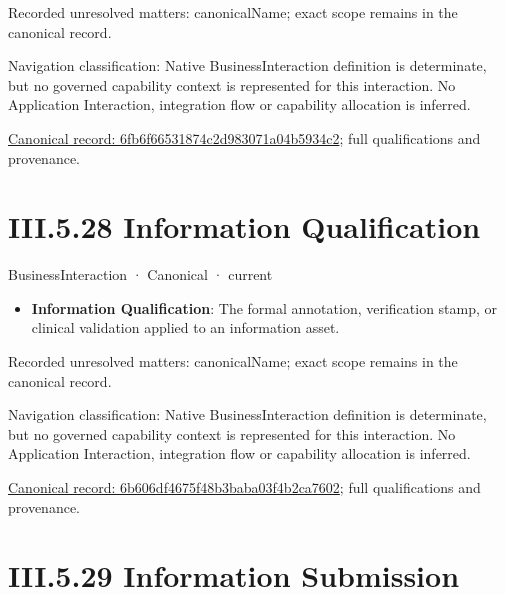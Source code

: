 {\small Recorded unresolved matters: canonicalName; exact scope remains in the canonical record.}\par
{\small Navigation classification: Native BusinessInteraction definition is determinate, but no governed capability context is represented for this interaction. No Application Interaction, integration flow or capability allocation is inferred.}\par
{\footnotesize \href{../../../../../../../continuum/business/business-interaction/6fb6f66531874c2d983071a04b5934c2.md}{Canonical record: 6fb6f66531874c2d983071a04b5934c2}; full qualifications and provenance.}\par
\section*{III.5.28 Information Qualification}
\label{navigation:III.5.28}

\label{element:6b606df4675f48b3baba03f4b2ca7602}
{\small BusinessInteraction · Canonical · current}\par

\begin{itemize}


\item \textbf{Information Qualification}: The formal annotation, verification stamp, or clinical validation applied to an information asset.

\end{itemize}

{\small Recorded unresolved matters: canonicalName; exact scope remains in the canonical record.}\par
{\small Navigation classification: Native BusinessInteraction definition is determinate, but no governed capability context is represented for this interaction. No Application Interaction, integration flow or capability allocation is inferred.}\par
{\footnotesize \href{../../../../../../../continuum/business/business-interaction/6b606df4675f48b3baba03f4b2ca7602.md}{Canonical record: 6b606df4675f48b3baba03f4b2ca7602}; full qualifications and provenance.}\par
\section*{III.5.29 Information Submission}
\label{navigation:III.5.29}

